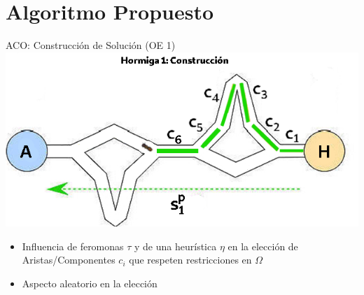 

\section{Algoritmo Propuesto}



\begin{frame}{ACO: Construcci\'on de Soluci\'on (OE 1)}
\centering
\includegraphics[scale=0.4]{Pictures/ACO-ant-Constr.png}
\begin{itemize}
    \item Influencia de feromonas $\tau$ y de una heur\'istica $\eta$ en la elecci\'on de Aristas/Componentes $c_i$ que respeten restricciones en $\Omega$
    \item Aspecto aleatorio en la elecci\'on
\end{itemize}
\end{frame}

